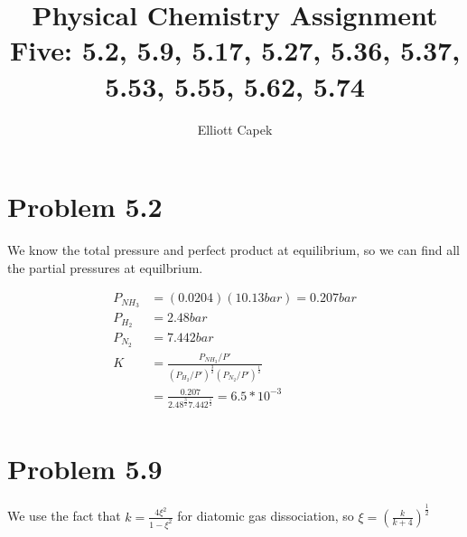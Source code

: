 \documentclass[10pt]{article} %
\title{Physical Chemistry Assignment Five: 5.2, 5.9, 5.17, 5.27, 5.36, 5.37, 5.53, 5.55, 5.62, 5.74}
\author{Elliott Capek}
\begin{document}
\maketitle{}

\section{Problem 5.2}

We know the total pressure and perfect product at equilibrium, so we can find all the partial pressures at equilbrium.

\begin{align*}
  P_{NH_3} &= (0.0204)(10.13 bar) = 0.207 bar\\
  P_{H_2} &= 2.48 bar\\
  P_{N_2} &= 7.442 bar\\
  K &= \frac{P_{NH_3}/P'}{(P_{H_2}/P')^\frac{3}{2}(P_{N_2}/P')^{\frac{1}{2}}}\\
  &= \frac{0.207}{2.48^\frac{3}{2}7.442^\frac{1}{2}} = 6.5 * 10^{-3}\\
\end{align*}

\section{Problem 5.9}
We use the fact that $k = \frac{4\xi^2}{1-\xi^2}$ for diatomic gas dissociation, so $\xi = \left(\frac{k}{k+4}\right)^\frac{1}{2}$\\
\end{document}
